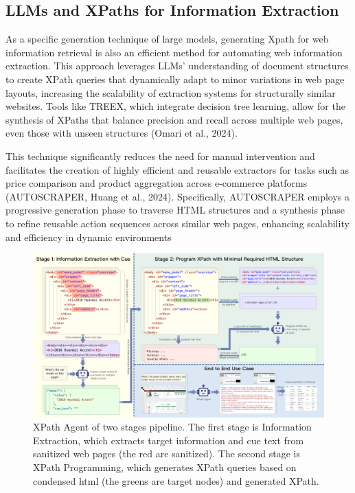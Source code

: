 \documentclass[a4paper]{article}
\begin{document}
\subsection{LLMs and XPaths for Information Extraction}
As a specific generation technique of large models, generating Xpath for web information retrieval is also an efficient method for automating web information extraction. This approach leverages LLMs’ understanding of document structures to create XPath queries that dynamically adapt to minor variations in web page layouts, increasing the scalability of extraction systems for structurally similar websites. Tools like TREEX, which integrate decision tree learning, allow for the synthesis of XPaths that balance precision and recall across multiple web pages, even those with unseen structures (Omari et al., 2024). 

This technique significantly reduces the need for manual intervention and facilitates the creation of highly efficient and reusable extractors for tasks such as price comparison and product aggregation across e-commerce platforms (AUTOSCRAPER, Huang et al., 2024). Specifically, AUTOSCRAPER employs a progressive generation phase to traverse HTML structures and a synthesis phase to refine reusable action sequences across similar web pages, enhancing scalability and efficiency in dynamic environments
\begin{figure}[h]
  \centering
  \includegraphics[width=1\textwidth]{./workflow.png}
  \caption{XPath Agent of two stages pipeline. The first stage is Information Extraction, which extracts target information and cue text from sanitized web pages (the red are sanitized). The second stage is XPath Programming, which generates XPath queries based on condensed html (the greens are target nodes) and generated XPath.}
  \label{fig:workflow}
  \vspace{20pt} %
\end{figure}
\end{document}
